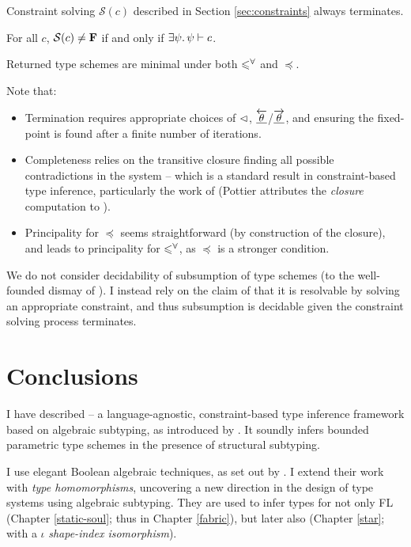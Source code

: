 \begin{conjecture}[Termination]
    Constraint solving $\mathcal S(c)$ described in Section \ref{sec:constraints} always terminates.
\end{conjecture}

\begin{conjecture}[Completeness]    
    For all $c$, $\mathcal S(c) \ne \mathbf F$ if and only if $\exists \psi \ldotp \psi \vdash c$.
\end{conjecture}

\begin{conjecture}[Principality]
    Returned type schemes are minimal under both $\leqslant^\forall$ and $\preceq$.
\end{conjecture}

Note that: \begin{itemize}
    \item Termination requires appropriate choices of $\lhd$, $\underline{\overleftarrow{\theta}}$/$\underline{\overrightarrow{\theta}}$, and ensuring the fixed-point is found after a finite number of iterations.
    \item Completeness relies on the transitive closure finding all possible contradictions in the system -- which is a standard result in constraint-based type inference, particularly the work of \textcite{pottier-framework} (Pottier attributes the \emph{closure} computation to \textcite{closure-in-type-inference}).
    \item Principality for $\preceq$ seems straightforward (by construction of the closure), and leads to principality for $\leqslant^\forall$, as $\preceq$ is a stronger condition.
\end{itemize}
We do not consider decidability of subsumption of type schemes (to the well-founded dismay of \textcite{dolan-thesis}). I instead rely on the claim of \textcite{mlstruct} that it is resolvable by solving an appropriate constraint, and thus subsumption is decidable given the constraint solving process terminates.

\section{Conclusions}
\label{sec:conclusions}

I have described \inference{} -- a language-agnostic, constraint-based type inference framework based on algebraic subtyping, as introduced by \textcite{mlsub}.
It soundly infers bounded parametric type schemes in the presence of structural subtyping. 

I use elegant Boolean algebraic techniques, as set out by \textcite{mlstruct}. I extend their work with \emph{type homomorphisms}, uncovering a new direction in the design of type systems using algebraic subtyping. They are used to infer types for not only FL (Chapter \ref{static-soul}; thus \fabric{} in Chapter \ref{fabric}), but later also  \starr{} (Chapter \ref{star}; with a $\iota$ \emph{shape-index isomorphism}).

